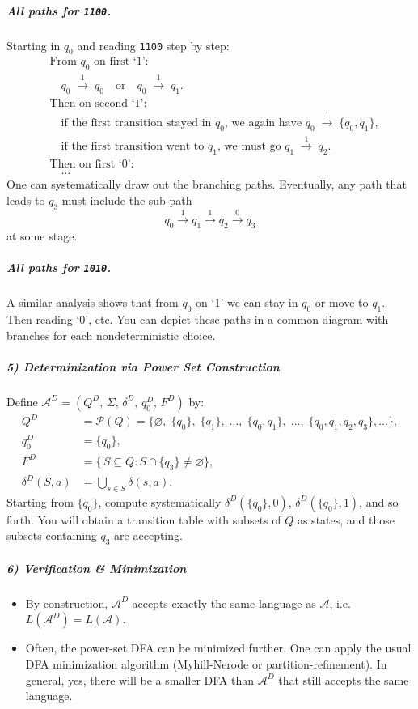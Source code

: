 \documentclass{article}
\begin{document}
\subparagraph{All paths for \texttt{1100}.}
Starting in $q_0$ and reading \texttt{1100} step by step:
\[
\begin{aligned}
&\text{From }q_0\text{ on first `1':}\\
&\quad q_0 \;\xrightarrow{1}\; q_0 \quad\text{or}\quad q_0 \;\xrightarrow{1}\; q_1.\\[6pt]
&\text{Then on second `1':}\\
&\quad \text{if the first transition stayed in }q_0\text{, we again have }q_0 \;\xrightarrow{1}\; \{q_0,q_1\},\\
&\quad \text{if the first transition went to }q_1\text{, we must go }q_1 \;\xrightarrow{1}\; q_2.\\[6pt]
&\text{Then on first `0':}\\
&\quad \dots 
\end{aligned}
\]
One can systematically draw out the branching paths.  Eventually, any path that leads to $q_3$ must include the sub-path 
\[
q_0 \xrightarrow{1} q_1 \xrightarrow{1} q_2 \xrightarrow{0} q_3
\]
at some stage.

\subparagraph{All paths for \texttt{1010}.}
A similar analysis shows that from $q_0$ on `1' we can stay in $q_0$ or move to $q_1$.  Then reading `0', etc.  You can depict these paths in a common diagram with branches for each nondeterministic choice.

\subparagraph*{5) Determinization via Power Set Construction}
Define $\mathcal{A}^D = (Q^D,\,\Sigma,\,\delta^D,\,q_0^D,\,F^D)$ by:
\[
\begin{aligned}
Q^D &= \mathcal{P}(Q) = \{\varnothing,\;\{q_0\},\;\{q_1\},\;\dots,\;\{q_0,q_1\},\;\dots,\;\{q_0,q_1,q_2,q_3\},\dots\},\\
q_0^D &= \{q_0\},\\
F^D &= \{\,S \subseteq Q : S \cap \{q_3\} \neq \varnothing\},\\
\delta^D(S, a) &= \bigcup_{s \in S} \delta(s,a).
\end{aligned}
\]
Starting from $\{q_0\}$, compute systematically $\delta^D(\{q_0\},0)$, $\delta^D(\{q_0\},1)$, and so forth.  You will obtain a transition table with subsets of $Q$ as states, and those subsets containing $q_3$ are accepting.

\subparagraph*{6) Verification \& Minimization}
\begin{itemize}
\item By construction, $\mathcal{A}^D$ accepts exactly the same language as $\mathcal{A}$, i.e.\ $L(\mathcal{A}^D) = L(\mathcal{A})$.
\item Often, the power-set DFA can be minimized further.  One can apply the usual DFA minimization algorithm (Myhill-Nerode or partition-refinement).  In general, yes, there will be a smaller DFA than $\mathcal{A}^D$ that still accepts the same language.
\end{itemize}
\end{document}

